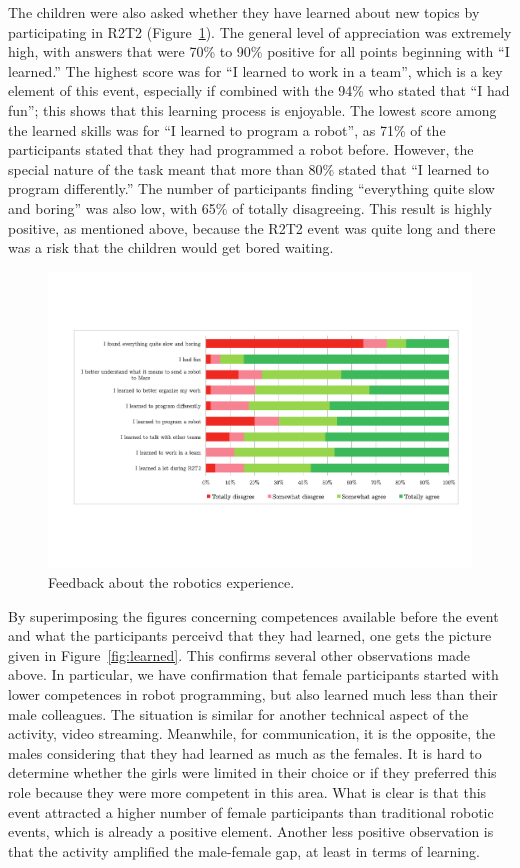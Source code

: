 \documentclass{intech-journal}
\begin{document}
The children were also asked whether they have learned about new topics by participating in R2T2 (Figure~\ref{fig:robotics}). 
The general level of appreciation was extremely high, with answers that were 70\% to 90\% positive for all points beginning with ``I learned.''
The highest score was for ``I learned to work in a team'', which is a key element of this event, especially if combined with the 94\% who stated that ``I had fun''; this shows that this learning process is enjoyable.
The lowest score among the learned skills was for ``I learned to program a robot'', as 71\% of the participants stated that they had programmed a robot before.
However, the special nature of the task meant that more than 80\% stated that ``I learned to program differently.''
The number of participants finding ``everything quite slow and boring'' was also low, with 65\% of totally disagreeing. 
This result is highly positive, as mentioned above, because the R2T2 event was quite long and there was a risk that the children would get bored waiting. 

\begin{figure}[ht]
 \centering
    \includegraphics[width=0.9\columnwidth]{figures/robotics.pdf}
  \caption{Feedback about the robotics experience.}
  \label{fig:robotics} 
\end{figure}

By superimposing the figures concerning competences available before the event and what the participants perceivd that they had learned, one gets the picture given in Figure~\ref{fig:learned}.
This confirms several other observations made above.
In particular, we have confirmation that female participants started with lower competences in robot programming, but also learned much less than their male colleagues. 
The situation is similar for another technical aspect of the activity, video streaming. 
Meanwhile, for communication, it is the opposite, the males considering that they had learned as much as the females. 
It is hard to determine whether the girls were limited in their choice or if they preferred this role because they were more competent in this area. 
What is clear is that this event attracted a higher number of female participants than traditional robotic events, which is already a positive element.
Another less positive observation is that the activity amplified the male-female gap, at least in terms of learning. 
\end{document}
